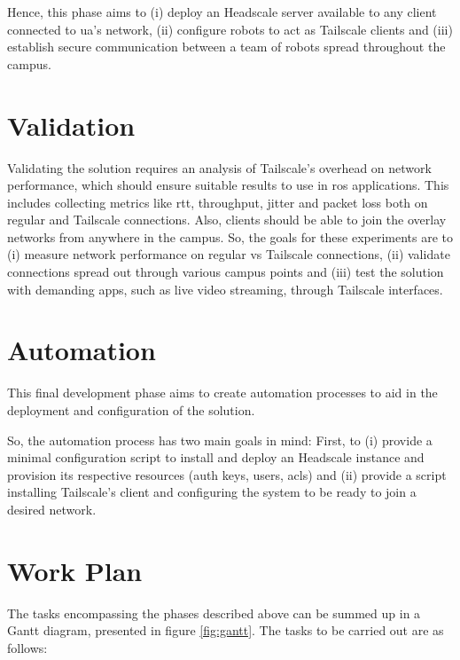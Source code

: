 \documentclass[11pt,twoside,a4paper]{report}
\begin{document}
Hence, this phase aims to (i) deploy an Headscale server available to any client connected to \ac{ua}'s network, (ii) configure robots to act as Tailscale clients and (iii) establish secure communication between a team of robots spread throughout the campus.


\section{Validation}
\label{sec:metvalidation}

Validating the solution requires an analysis of Tailscale's overhead on  network performance, which should ensure suitable results to use in \ac{ros} applications. This includes collecting metrics like \ac{rtt}, throughput, jitter and packet loss both on regular and Tailscale connections. Also, clients should be able to join the overlay networks from anywhere in the campus. So, the goals for these experiments are to (i) measure network performance on regular vs Tailscale connections, (ii) validate connections spread out through various campus points and (iii) test the solution with demanding apps, such as live video streaming, through Tailscale interfaces.

\section{Automation}
\label{sec:automethod}

This final development phase aims to create automation processes to aid in the deployment and configuration of the solution.

So, the automation process has two main goals in mind: First, to (i) provide a minimal configuration script to install and deploy an Headscale instance and provision its respective resources (auth keys, users, \acp{acl}) and (ii) provide a script installing Tailscale's client and configuring the system to be ready to join a desired network.

\section{Work Plan}

The tasks encompassing the phases described above can be summed up in a Gantt diagram, presented in figure \ref{fig:gantt}. The tasks to be carried out are as follows:
\end{document}
